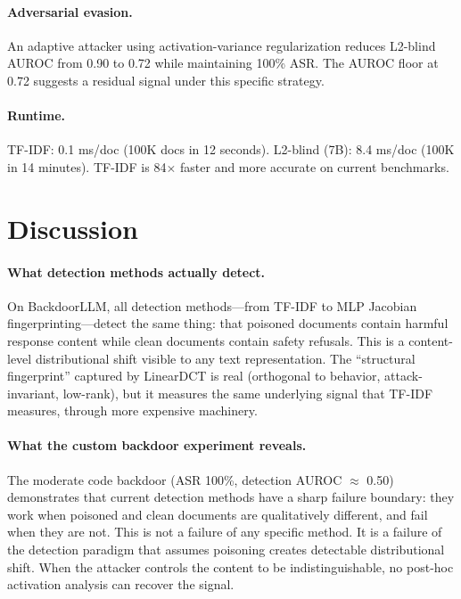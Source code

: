 \documentclass{article}
\begin{document}
\paragraph{Adversarial evasion.} An adaptive attacker using activation-variance regularization reduces L2-blind AUROC from 0.90 to 0.72 while maintaining 100\% ASR. The AUROC floor at 0.72 suggests a residual signal under this specific strategy.

\paragraph{Runtime.} TF-IDF: 0.1 ms/doc (100K docs in 12 seconds). L2-blind (7B): 8.4 ms/doc (100K in 14 minutes). TF-IDF is 84$\times$ faster and more accurate on current benchmarks.

\section{Discussion}

\paragraph{What detection methods actually detect.} On BackdoorLLM, all detection methods---from TF-IDF to MLP Jacobian fingerprinting---detect the same thing: that poisoned documents contain harmful response content while clean documents contain safety refusals. This is a content-level distributional shift visible to any text representation. The ``structural fingerprint'' captured by LinearDCT is real (orthogonal to behavior, attack-invariant, low-rank), but it measures the same underlying signal that TF-IDF measures, through more expensive machinery.

\paragraph{What the custom backdoor experiment reveals.} The moderate code backdoor (ASR 100\%, detection AUROC $\approx$ 0.50) demonstrates that current detection methods have a sharp failure boundary: they work when poisoned and clean documents are qualitatively different, and fail when they are not. This is not a failure of any specific method. It is a failure of the detection paradigm that assumes poisoning creates detectable distributional shift. When the attacker controls the content to be indistinguishable, no post-hoc activation analysis can recover the signal.
\end{document}
